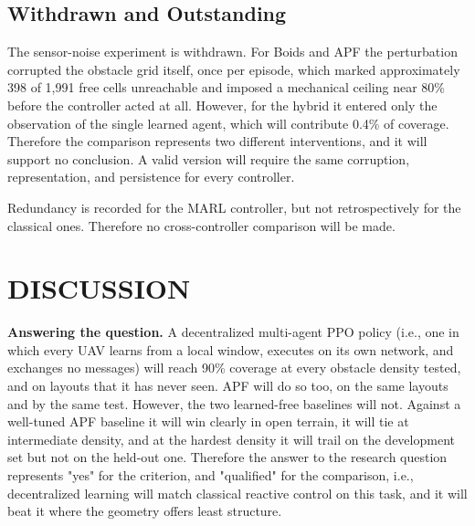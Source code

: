 \documentclass[a4paper, 10pt, conference]{ieeeconf}
\begin{document}
\subsection{Withdrawn and Outstanding}

The sensor-noise experiment is withdrawn. For Boids and APF the
perturbation corrupted the obstacle grid itself, once per episode,
which marked approximately 398 of 1{,}991 free cells unreachable and
imposed a mechanical ceiling near 80\% before the controller acted at
all. However, for the hybrid it entered only the observation of the
single learned agent, which will contribute 0.4\% of coverage.
Therefore the comparison represents two different interventions, and
it will support no conclusion. A valid version will require the same
corruption, representation, and persistence for every controller.

Redundancy is recorded for the MARL controller, but not
retrospectively for the classical ones. Therefore no cross-controller
comparison will be made.

\section{DISCUSSION}\label{sec:discussion}

\textbf{Answering the question.} A decentralized multi-agent PPO
policy (i.e., one in which every UAV learns from a local window,
executes on its own network, and exchanges no messages) will reach
90\% coverage at every obstacle density tested, and on layouts that it
has never seen. APF will do so too, on the same layouts and by the
same test. However, the two learned-free baselines will not. Against a
well-tuned APF baseline it will win clearly in open terrain, it will
tie at intermediate density, and at the hardest density it will trail
on the development set but not on the held-out one. Therefore the
answer to the research question represents "yes" for the criterion,
and "qualified" for the comparison, i.e., decentralized learning will
match classical reactive control on this task, and it will beat it
where the geometry offers least structure.
\end{document}
